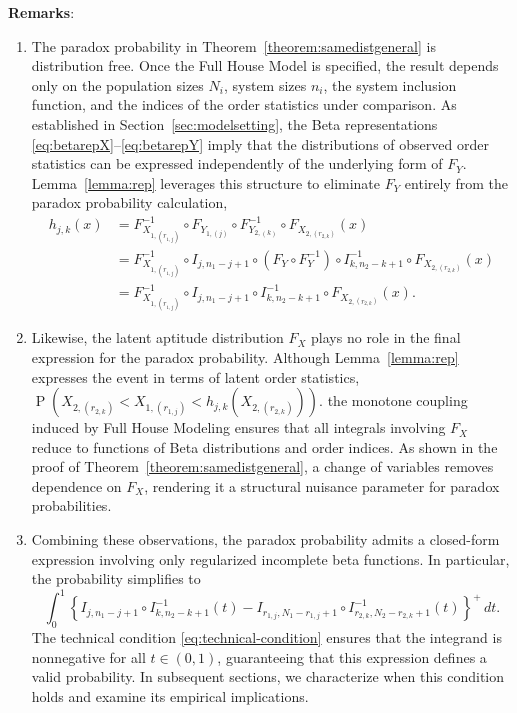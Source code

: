 \documentclass[12pt]{article}
\DeclareMathOperator*{\Prob}{P}
\begin{document}
\noindent \textbf{Remarks}:
\begin{enumerate}
	\item The paradox probability in Theorem~\ref{theorem:samedistgeneral} is distribution free. Once the Full House Model is specified, the result depends only on the population sizes $N_i$, system sizes $n_i$, the system inclusion function, and the indices of the order statistics under comparison. As established in Section~\ref{sec:modelsetting}, the Beta representations \eqref{eq:betarepX}--\eqref{eq:betarepY} imply that the distributions of observed order statistics can be expressed independently of the underlying form of $F_Y$. Lemma~\ref{lemma:rep} leverages this structure to eliminate $F_Y$ entirely from the paradox probability calculation, 
\begin{align*}
	h_{j,k}(x) &= F_{X_{1,(r_{1,j})}}^{-1} \circ F_{Y_{1, (j)}} \circ F_{Y_{2, (k)}}^{-1} \circ F_{X_{2,(r_{2,k})}} (x) \\
	&= F_{X_{1,(r_{1,j})}}^{-1} \circ I_{j,n_1-j+1} \circ \left(F_Y \circ F_Y^{-1}\right) \circ I^{-1}_{k,n_2-k+1} \circ F_{X_{2,(r_{2,k})}} (x) \\
	&= F_{X_{1,(r_{1,j})}}^{-1} \circ I_{j,n_1-j+1}  \circ I^{-1}_{k,n_2-k+1} \circ F_{X_{2,(r_{2,k})}} (x).
\end{align*}

	\item Likewise, the latent aptitude distribution $F_X$ plays no role in the final expression for the paradox probability. Although Lemma~\ref{lemma:rep} expresses the event in terms of latent order statistics, 
	$
	  \Prob\left( X_{2,(r_{2,k})} < X_{1,(r_{1,j})}  < h_{j,k}\left(X_{2,(r_{2,k})}\right)\right).
	$
	the monotone coupling induced by Full House Modeling ensures that all integrals involving $F_X$ reduce to functions of Beta distributions and order indices. As shown in the proof of Theorem~\ref{theorem:samedistgeneral}, a change of variables removes dependence on $F_X$, rendering it a structural nuisance parameter for paradox probabilities.

	\item Combining these observations, the paradox probability admits a closed-form expression involving only regularized incomplete beta functions. In particular, the probability simplifies to
	$$
	  \int_0^1\left\{
		I_{j, n_1-j+1} \circ I_{k, n_2-k+1}^{-1}(t)
		-
		I_{r_{1,j}, N_1-r_{1,j}+1} \circ I_{r_{2,k}, N_2-r_{2,k}+1}^{-1}(t)
	  \right\}^{+}\, dt.
	$$
	The technical condition \eqref{eq:technical-condition} ensures that the integrand is nonnegative for all $t \in (0,1)$, guaranteeing that this expression defines a valid probability. In subsequent sections, we characterize when this condition holds and examine its empirical implications.
\end{enumerate}
\end{document}
